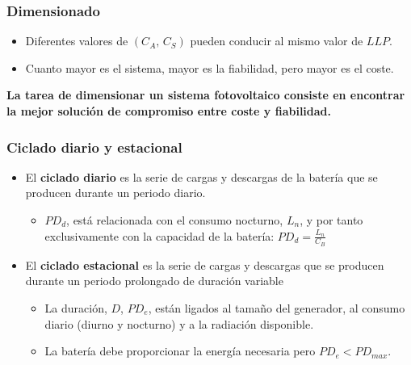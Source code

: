 \documentclass[serif, xcolor=dvipsnames]{beamer}
\begin{document}
\begin{frame}
\frametitle{Dimensionado}
\begin{block}
{}
\begin{itemize}
\item Diferentes valores de $(C_{A},\, C_{S})$ pueden conducir al mismo
valor de $LLP$.
\item Cuanto mayor es el sistema, mayor es la fiabilidad, pero mayor es
el coste.
\end{itemize}
\end{block}
{}
\begin{block}
{}

\textbf{La tarea de dimensionar un sistema fotovoltaico consiste en
encontrar la mejor solución de compromiso entre coste y fiabilidad.}

\end{block}

\end{frame}

\begin{frame}
\frametitle{Ciclado diario y estacional}
\begin{itemize}
\item El \textbf{ciclado diario }es la serie de cargas y descargas de la
batería que se producen durante un periodo diario. 

\begin{itemize}
\item $PD_{d}$, está relacionada con el consumo nocturno, $L_{n}$, y por
tanto exclusivamente con la capacidad de la batería: $PD_{d}=\frac{L_{n}}{C_{B}}$
\end{itemize}
\item El \textbf{ciclado estacional} es la serie de cargas y descargas que
se producen durante un periodo prolongado de duración variable 

\begin{itemize}
\item La duración, $D$, $PD_{e}$, están ligados al tamaño del generador,
al consumo diario (diurno y nocturno) y a la radiación disponible. 
\item La batería debe proporcionar la energía necesaria pero $PD_{e}<PD_{max}$. 
\end{itemize}
\end{itemize}

\end{frame}
\end{document}
